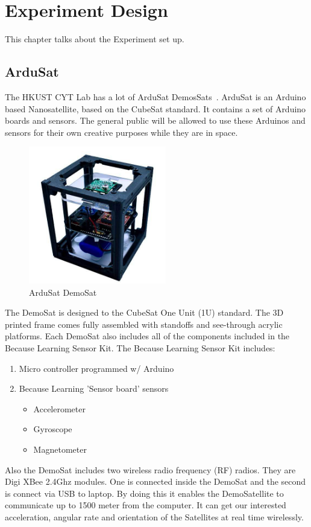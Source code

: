 \chapter{Experiment Design}\label{sec-DOE}
This chapter talks about the Experiment set up.
\section{ArduSat}
The HKUST CYT Lab has a lot of ArduSat DemosSats~\cite{geeroms2015ardusat,peters2016ardusat}. ArduSat is an Arduino based Nanosatellite, based on the CubeSat standard. It contains a set of Arduino boards and sensors. The general public will be allowed to use these Arduinos and sensors for their own creative purposes while they are in space. 
\begin{figure}[ht]
\centering
\includegraphics[width=6cm]{fig/DOE/Demosat}
\caption{ArduSat DemoSat}
\end{figure}
The DemoSat is designed to the CubeSat One Unit (1U) standard. The 3D printed frame comes fully assembled with standoffs and see-through acrylic platforms. Each DemoSat also includes all of the components included in the Because Learning Sensor Kit. The Because Learning Sensor Kit includes:
\begin{enumerate}
\item Micro controller programmed w/ Arduino 
\item Because Learning 'Sensor board' sensors 
\begin{itemize}
\item Accelerometer
\item Gyroscope
\item Magnetometer
\end{itemize}
\end{enumerate} 
Also the DemoSat includes two wireless radio frequency (RF) radios. They are Digi XBee 2.4Ghz modules. One is connected inside the DemoSat and the second is connect via USB to laptop. By doing this it enables the DemoSatellite to communicate up to 1500 meter from the computer.
It can get our interested acceleration, angular rate and orientation of the Satellites at real time wirelessly.
